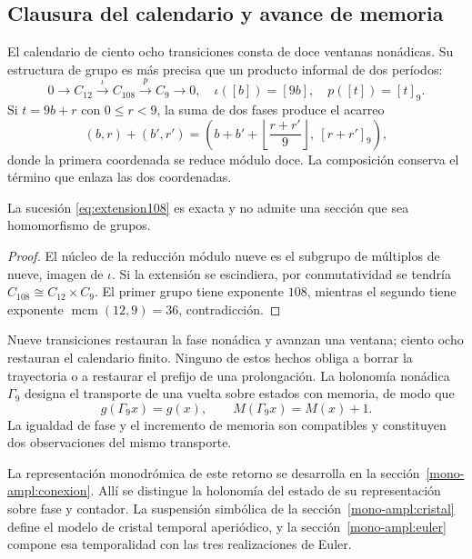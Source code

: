 \subsection{Clausura del calendario y avance de memoria}

El calendario de ciento ocho transiciones consta de doce ventanas nonádicas. Su estructura de grupo es más precisa que un producto informal de dos períodos:
\begin{equation}
 0\longrightarrow C_{12}\xrightarrow{\iota}C_{108}
 \xrightarrow{p}C_9\longrightarrow0,
 \quad\iota([b])=[9b],\quad p([t])=[t]_9.
 \label{eq:extension108}
\end{equation}
Si \(t=9b+r\) con \(0\le r<9\), la suma de dos fases produce el acarreo
\[
 (b,r)+(b',r')=
 \left(b+b'+\left\lfloor\frac{r+r'}9\right\rfloor,\ [r+r']_9\right),
\]
donde la primera coordenada se reduce módulo doce. La composición conserva el término que enlaza las dos coordenadas.

\begin{proposition}
La sucesión \eqref{eq:extension108} es exacta y no admite una sección que sea homomorfismo de grupos.
\end{proposition}
\begin{proof}
El núcleo de la reducción módulo nueve es el subgrupo de múltiplos de nueve, imagen de \(\iota\). Si la extensión se escindiera, por conmutatividad se tendría \(C_{108}\cong C_{12}\times C_9\). El primer grupo tiene exponente \(108\), mientras el segundo tiene exponente \(\operatorname{mcm}(12,9)=36\), contradicción.
\end{proof}

Nueve transiciones restauran la fase nonádica y avanzan una ventana; ciento ocho restauran el calendario finito. Ninguno de estos hechos obliga a borrar la trayectoria o a restaurar el prefijo de una prolongación. La holonomía nonádica \(\Gamma_9\) designa el transporte de una vuelta sobre estados con memoria, de modo que
\begin{equation}
 g(\Gamma_9x)=g(x),\qquad M(\Gamma_9x)=M(x)+1.
 \label{eq:holonomia-memoria}
\end{equation}
La igualdad de fase y el incremento de memoria son compatibles y constituyen dos observaciones del mismo transporte.



La representación monodrómica de este retorno se desarrolla en la
sección~\ref{mono-ampl:conexion}. Allí se distingue la holonomía del
estado de su representación sobre fase y contador. La suspensión
simbólica de la sección~\ref{mono-ampl:cristal} define el modelo de
cristal temporal aperiódico, y la sección~\ref{mono-ampl:euler}
compone esa temporalidad con las tres realizaciones de Euler.


